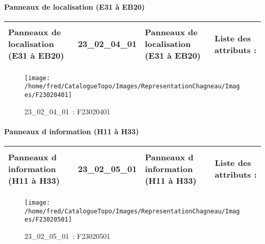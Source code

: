 \documentclass[12pt,titlepage,oneside]{book}
\begin{document}
\paragraph{Panneaux de localisation (E31 à EB20)}
\noindent
\vspace{\baselineskip}

\renewcommand{\arraystretch}{1.2}
\begin{supertabular}{|p{10cm}|c|p{13cm}|p{12cm}|}
 Panneaux de localisation (E31 à EB20) & 23\_02\_04\_01 & Panneaux de localisation (E31 à EB20) & Liste des attributs :
\begin{enumerate}
\end{enumerate}
\\
\hline
\end{supertabular}
\begin{figure}[h!]
  \hfill         %
  \begin{minipage}[t]{3cm}
    \begin{center}
      \texttt{[image: /home/fred/CatalogueTopo/Images/RepresentationChagneau/Images/F23020401]}
      \caption[~23\_02\_04\_01]{\small{23\_02\_04\_01~:} \tiny{F23020401}}\label{F23020401}
    \end{center}
  \end{minipage}
\end{figure}


\paragraph{Panneaux d information (H11 à H33)}
\noindent
\vspace{\baselineskip}

\renewcommand{\arraystretch}{1.2}
\begin{supertabular}{|p{10cm}|c|p{13cm}|p{12cm}|}
 Panneaux d information (H11 à H33) & 23\_02\_05\_01 & Panneaux d information (H11 à H33) & Liste des attributs :
\begin{enumerate}
\end{enumerate}
\\
\hline
\end{supertabular}
\begin{figure}[h!]
  \hfill         %
  \begin{minipage}[t]{3cm}
    \begin{center}
      \texttt{[image: /home/fred/CatalogueTopo/Images/RepresentationChagneau/Images/F23020501]}
      \caption[~23\_02\_05\_01]{\small{23\_02\_05\_01~:} \tiny{F23020501}}\label{F23020501}
    \end{center}
  \end{minipage}
\end{figure}
\end{document}
